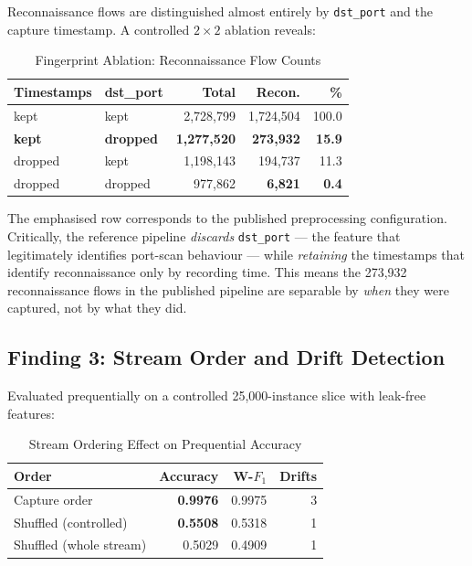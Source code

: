 \documentclass[conference]{IEEEtran}
\newcommand{\col}[1]{\texttt{\small #1}}
\begin{document}
Reconnaissance flows are distinguished almost entirely by \col{dst\_port} and the capture timestamp. A controlled $2 \times 2$ ablation reveals:

\begin{table}[htbp]
\caption{Fingerprint Ablation: Reconnaissance Flow Counts}
\centering
\begin{tabular}{llrrr}
\toprule
\textbf{Timestamps} & \textbf{dst\_port} & \textbf{Total} & \textbf{Recon.} & \textbf{\%} \\
\midrule
kept & kept & 2,728,799 & 1,724,504 & 100.0 \\
\textbf{kept} & \textbf{dropped} & \textbf{1,277,520} & \textbf{273,932} & \textbf{15.9} \\
dropped & kept & 1,198,143 & 194,737 & 11.3 \\
dropped & dropped & 977,862 & \textbf{6,821} & \textbf{0.4} \\
\bottomrule
\end{tabular}
\label{tab:ablation}
\end{table}

The emphasised row corresponds to the published preprocessing configuration. Critically, the reference pipeline \emph{discards} \col{dst\_port} --- the feature that legitimately identifies port-scan behaviour --- while \emph{retaining} the timestamps that identify reconnaissance only by recording time. This means the 273,932 reconnaissance flows in the published pipeline are separable by \emph{when} they were captured, not by what they did.

\subsection{Finding 3: Stream Order and Drift Detection}
\label{sec:drift}

Evaluated prequentially on a controlled 25,000-instance slice with leak-free features:

\begin{table}[htbp]
\caption{Stream Ordering Effect on Prequential Accuracy}
\centering
\begin{tabular}{lrrr}
\toprule
\textbf{Order} & \textbf{Accuracy} & \textbf{W-$F_1$} & \textbf{Drifts} \\
\midrule
Capture order & \textbf{0.9976} & 0.9975 & 3 \\
Shuffled (controlled) & \textbf{0.5508} & 0.5318 & 1 \\
Shuffled (whole stream) & 0.5029 & 0.4909 & 1 \\
\bottomrule
\end{tabular}
\label{tab:order}
\end{table}
\end{document}
